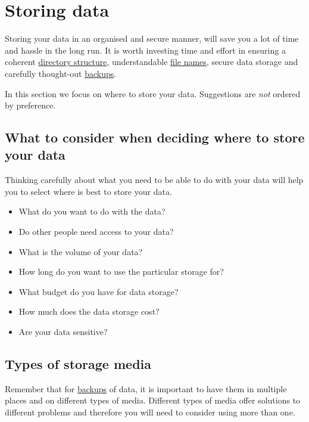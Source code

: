 \documentclass[12pt,a4paper,oneside]{report}
\providecommand{\tightlist}{%
  \setlength{\itemsep}{0pt}\setlength{\parskip}{0pt}}
\begin{document}
\hypertarget{storing-data}{%
\chapter{Storing data}\label{storing-data}}

Storing your data in an organised and secure manner, will save you a lot
of time and hassle in the long run. It is worth investing time and
effort in ensuring a coherent
\protect\hyperlink{directory-structure}{directory structure},
understandable \protect\hyperlink{file-naming}{file names}, secure data
storage and carefully thought-out
\protect\hyperlink{data-backup}{backups}.

In this section we focus on where to store your data. Suggestions are
\emph{not} ordered by preference.

\hypertarget{what-to-consider-when-deciding-where-to-store-your-data}{%
\section{What to consider when deciding where to store your
data}\label{what-to-consider-when-deciding-where-to-store-your-data}}

Thinking carefully about what you need to be able to do with your data
will help you to select where is best to store your data.

\begin{itemize}
\tightlist
\item
  What do you want to do with the data?
\item
  Do other people need access to your data?
\item
  What is the volume of your data?
\item
  How long do you want to use the particular storage for?
\item
  What budget do you have for data storage?
\item
  How much does the data storage cost?
\item
  Are your data sensitive?
\end{itemize}

\hypertarget{types-of-storage-media}{%
\section{Types of storage media}\label{types-of-storage-media}}

Remember that for \protect\hyperlink{data-backup}{backups} of data, it
is important to have them in multiple places and on different types of
media. Different types of media offer solutions to different problems
and therefore you will need to consider using more than one.
\end{document}
